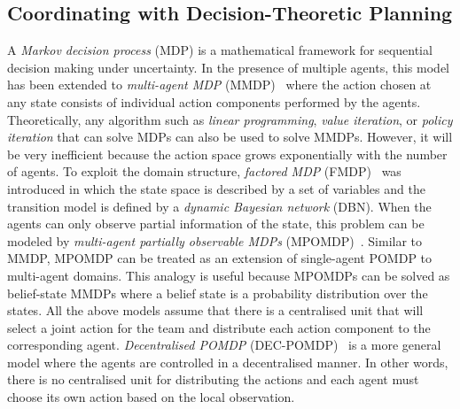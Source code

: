 \subsection{Coordinating with Decision-Theoretic Planning}

A {\em Markov decision process} (MDP) is a mathematical framework
for sequential decision making under uncertainty. In the presence
of multiple agents, this model has been extended to {\em
multi-agent MDP} (MMDP)~\cite{boutilier1996planning} where the
action chosen at any state consists of individual action components
performed by the agents. Theoretically, any algorithm such as {\em
linear programming}, {\em value iteration}, or {\em policy
iteration} that can solve MDPs can also be used to solve MMDPs.
However, it will be very inefficient because the action space grows
exponentially with the number of agents. To exploit the domain
structure, {\em factored MDP} (FMDP)~\cite{boutilier2000stochastic}
was introduced in which the state space is described by a set of
variables and the transition model is defined by a {\em dynamic
Bayesian network} (DBN). When the agents can only observe partial
information of the state, this problem can be modeled by {\em
multi-agent partially observable MDPs}
(MPOMDP)~\cite{pynadath2002communicative}. Similar to MMDP, MPOMDP
can be treated as an extension of single-agent POMDP to multi-agent
domains. This analogy is useful because MPOMDPs can be solved as
belief-state MMDPs where a belief state is a probability
distribution over the states. All the above models assume that
there is a centralised unit that will select a joint action for the
team and distribute each action component to the corresponding
agent. {\em Decentralised POMDP}
(DEC-POMDP)~\cite{bernstein2002complexity} is a more general model
where the agents are controlled in a decentralised manner. In other
words, there is no centralised unit for distributing the actions
and each agent must choose its own action based on the local
observation.

